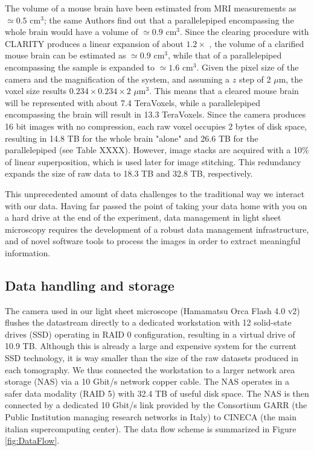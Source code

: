 \documentclass[12pt]{spieman}  %
\begin{document}
The volume of a mouse brain have been estimated from MRI measurements \cite{Kovacevic2005} as $\simeq 0.5$ $\text{cm}^3$; the same Authors find out that a parallelepiped encompassing the whole brain would have a volume of $\simeq 0.9$ $\text{cm}^3$. Since the clearing procedure with CLARITY produces a linear expansion of about $1.2\times$ \cite{Costantini}, the volume of a clarified mouse brain can be estimated as $\simeq 0.9$ $\text{cm}^3$, while that of a parallelepiped encompassing the sample is expanded to $\simeq 1.6$ $\text{cm}^3$. Given the pixel size of the camera and the magnification of the system, and assuming a $z$ step of 2 $\mu$m, the voxel size results $0.234\times0.234\times2$ $\mu\text{m}^3$. This means that a cleared mouse brain will be represented with about 7.4 TeraVoxels, while a parallelepiped encompassing the brain will result in 13.3 TeraVoxels. Since the camera produces 16 bit images with no compression, each raw voxel occupies 2 bytes of disk space, resulting in 14.8 TB for the whole brain "alone" and 26.6 TB for the parallelepiped (see Table XXXX). However, image stacks are acquired with a 10\% of linear superposition, which is used later for image stitching. This redundancy expands the size of raw data to 18.3 TB and 32.8 TB, respectively.

This unprecedented amount of data challenges to the traditional way we interact with our data. Having far passed the point of taking your data home with you on a hard drive at the end of the experiment, data management in light sheet microscopy requires the development of a robust data management infrastructure, and of novel software tools to process the images in order to extract meaningful information.

\subsection{Data handling and storage}

The camera used in our light sheet microscope (Hamamatsu Orca Flash 4.0 v2) flushes the datastream directly to a dedicated workstation with 12 solid-state drives (SSD) operating in RAID 0 configuration, resulting in a virtual drive of 10.9 TB. Although this is already a large and expensive system for the current SSD technology, it is way smaller than the size of the raw datasets produced in each tomography. We thus connected the workstation to a larger network area storage (NAS) via a 10 Gbit/s network copper cable. The NAS operates in a safer data modality (RAID 5) with 32.4 TB of useful disk space. The NAS is then connected by a dedicated 10 Gbit/s link provided by the Consortium GARR (the Public Institution managing research networks in Italy) to CINECA (the main italian supercomputing center). The data flow scheme is summarized in Figure \ref{fig:DataFlow}.
\end{document}
